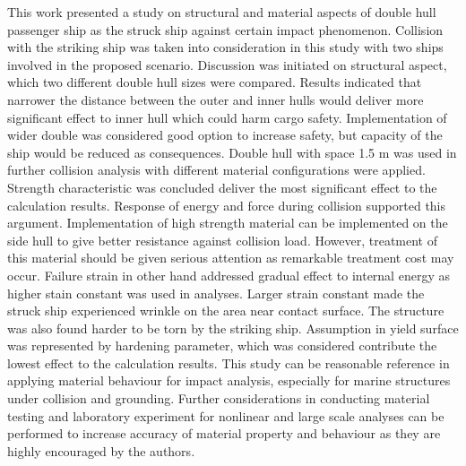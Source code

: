 \documentclass[../Final.tex]{subfiles}
\begin{document}
This work presented a study on structural and material aspects of double hull passenger ship as the struck ship against certain impact phenomenon. 
Collision with the striking ship was taken into consideration in this study with two ships involved in the proposed scenario. Discussion was initiated on structural aspect, which two different double hull sizes were compared. 
Results indicated that narrower the distance between the outer and inner hulls would deliver more significant effect to inner hull which could harm cargo safety. 
Implementation of wider double was considered good option to increase safety, but capacity of the ship would be reduced as consequences. 
Double hull with space 1.5 m was used in further collision analysis with different material configurations were applied. Strength characteristic was concluded deliver the most significant effect to the calculation results. 
Response of energy and force during collision supported this argument. Implementation of high strength material can be implemented on the side hull to give better resistance against collision load. 
However, treatment of this material should be given serious attention as remarkable treatment cost may occur. Failure strain in other hand addressed gradual effect to internal energy as higher stain constant was used in analyses. 
Larger strain constant made the struck ship experienced wrinkle on the area near contact surface. The structure was also found harder to be torn by the striking ship. 
Assumption in yield surface was represented by hardening parameter, which was considered contribute the lowest effect to the calculation results. 
This study can be reasonable reference in applying material behaviour for impact analysis, especially for marine structures under collision and grounding. 
Further considerations in conducting material testing and laboratory experiment for nonlinear and large scale analyses can be performed to increase accuracy of material property and behaviour as they are highly encouraged by the authors. 
\end{document}
